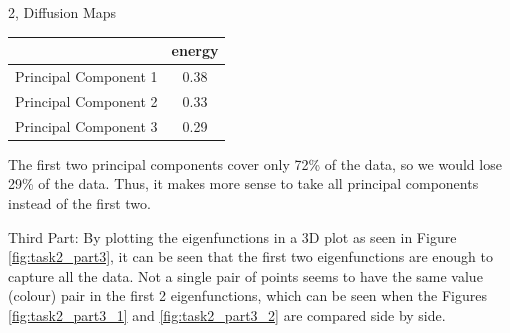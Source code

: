 \documentclass[10pt,a4paper]{article}
\begin{document}
\begin{task}{2, Diffusion Maps}
\begin{center}
\begin{tabular}{l|c}
& energy\\
\hline
Principal Component 1& 0.38\\
Principal Component 2& 0.33\\
Principal Component 3& 0.29\\
\hline
\end{tabular}
\end{center}

The first two principal components cover only 72\% of the data, so we would lose 29\% of the data. Thus, it makes more sense to take all principal components instead of the first two. 

\bigbreak
Third Part:
By plotting the eigenfunctions in a 3D plot as seen in Figure \ref{fig:task2_part3}, it can be seen that the first two eigenfunctions are enough to capture all the data. Not a single pair of points seems to have the same value (colour) pair in the first 2 eigenfunctions, which can be seen when the Figures \ref{fig:task2_part3_1} and \ref{fig:task2_part3_2} are compared side by side.\\


\end{task}
\end{document}
